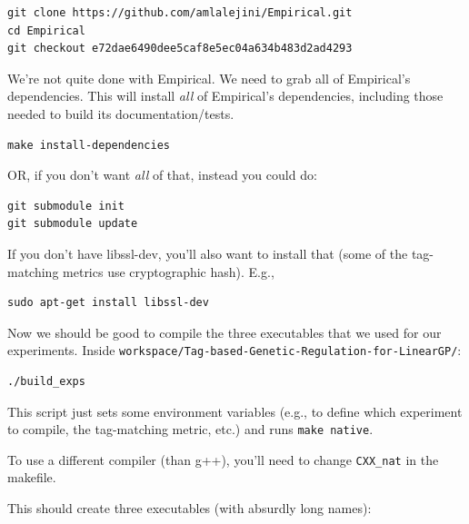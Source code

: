 \documentclass[
]{book}
\begin{document}
\begin{verbatim}
git clone https://github.com/amlalejini/Empirical.git
cd Empirical
git checkout e72dae6490dee5caf8e5ec04a634b483d2ad4293
\end{verbatim}

We're not quite done with Empirical. We need to grab all of Empirical's dependencies. This will install \emph{all} of Empirical's dependencies, including those needed to build its documentation/tests.

\begin{verbatim}
make install-dependencies
\end{verbatim}

OR, if you don't want \emph{all} of that, instead you could do:

\begin{verbatim}
git submodule init
git submodule update
\end{verbatim}

If you don't have libssl-dev, you'll also want to install that (some of the tag-matching metrics use cryptographic hash). E.g.,

\begin{verbatim}
sudo apt-get install libssl-dev
\end{verbatim}

Now we should be good to compile the three executables that we used for our experiments. Inside \texttt{workspace/Tag-based-Genetic-Regulation-for-LinearGP/}:

\begin{verbatim}
./build_exps
\end{verbatim}

This script just sets some environment variables (e.g., to define which experiment to compile, the tag-matching metric, etc.) and runs \texttt{make\ native}.

To use a different compiler (than g++), you'll need to change \texttt{CXX\_nat} in the makefile.

This should create three executables (with absurdly long names):
\end{document}
